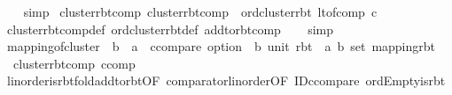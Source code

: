 \begin{isabellebody}
\ \ \isamarkupfalse%
\ simp%
\endisatagproof
{\isafoldproof}%
%
\isadelimproof
\isanewline
%
\endisadelimproof
\isanewline
{}\isamarkupfalse%
\ cluster{\isacharunderscore}{\kern0pt}rbt{\isacharunderscore}{\kern0pt}comp{\isacharcolon}{\kern0pt}\ {\isachardoublequoteopen}cluster{\isacharunderscore}{\kern0pt}rbt{\isacharunderscore}{\kern0pt}comp\ {\isacharequal}{\kern0pt}\ ord{\isachardot}{\kern0pt}cluster{\isacharunderscore}{\kern0pt}rbt\ {\isacharparenleft}{\kern0pt}lt{\isacharunderscore}{\kern0pt}of{\isacharunderscore}{\kern0pt}comp\ c{\isacharparenright}{\kern0pt}{\isachardoublequoteclose}\isanewline
%
\isadelimproof
\ \ %
\endisadelimproof
%
\isatagproof
{}\isamarkupfalse%
\ cluster{\isacharunderscore}{\kern0pt}rbt{\isacharunderscore}{\kern0pt}comp{\isacharunderscore}{\kern0pt}def\ ord{\isachardot}{\kern0pt}cluster{\isacharunderscore}{\kern0pt}rbt{\isacharunderscore}{\kern0pt}def\ add{\isacharunderscore}{\kern0pt}to{\isacharunderscore}{\kern0pt}rbt{\isacharunderscore}{\kern0pt}comp\isanewline
\ \ \isamarkupfalse%
\ simp%
\endisatagproof
{\isafoldproof}%
%
\isadelimproof
\isanewline
%
\endisadelimproof
\isanewline
{}\isamarkupfalse%
\isanewline
\isanewline
{}\isamarkupfalse%
\isanewline
\isanewline
{}\isamarkupfalse%
\ mapping{\isacharunderscore}{\kern0pt}of{\isacharunderscore}{\kern0pt}cluster\ {\isacharcolon}{\kern0pt}{\isacharcolon}{\kern0pt}\ {\isachardoublequoteopen}{\isacharparenleft}{\kern0pt}{\isacharprime}{\kern0pt}b\ {\isasymRightarrow}\ {\isacharprime}{\kern0pt}a\ {\isacharcolon}{\kern0pt}{\isacharcolon}{\kern0pt}\ ccompare\ option{\isacharparenright}{\kern0pt}\ {\isasymRightarrow}\ {\isacharparenleft}{\kern0pt}{\isacharprime}{\kern0pt}b{\isacharcomma}{\kern0pt}\ unit{\isacharparenright}{\kern0pt}\ rbt\ {\isasymRightarrow}\ {\isacharparenleft}{\kern0pt}{\isacharprime}{\kern0pt}a{\isacharcomma}{\kern0pt}\ {\isacharprime}{\kern0pt}b\ set{\isacharparenright}{\kern0pt}\ mapping{\isacharunderscore}{\kern0pt}rbt{\isachardoublequoteclose}\ \isanewline
\ \ {\isachardoublequoteopen}cluster{\isacharunderscore}{\kern0pt}rbt{\isacharunderscore}{\kern0pt}comp\ ccomp{\isachardoublequoteclose}\isanewline
%
\isadelimproof
\ \ %
\endisadelimproof
%
\isatagproof
{}\isamarkupfalse%
\ linorder{\isachardot}{\kern0pt}is{\isacharunderscore}{\kern0pt}rbt{\isacharunderscore}{\kern0pt}fold{\isacharunderscore}{\kern0pt}add{\isacharunderscore}{\kern0pt}to{\isacharunderscore}{\kern0pt}rbt{\isacharbrackleft}{\kern0pt}OF\ comparator{\isachardot}{\kern0pt}linorder{\isacharbrackleft}{\kern0pt}OF\ ID{\isacharunderscore}{\kern0pt}ccompare{\isacharprime}{\kern0pt}{\isacharbrackright}{\kern0pt}\ ord{\isachardot}{\kern0pt}Empty{\isacharunderscore}{\kern0pt}is{\isacharunderscore}{\kern0pt}rbt{\isacharbrackright}{\kern0pt}\isanewline

\end{isabellebody}
